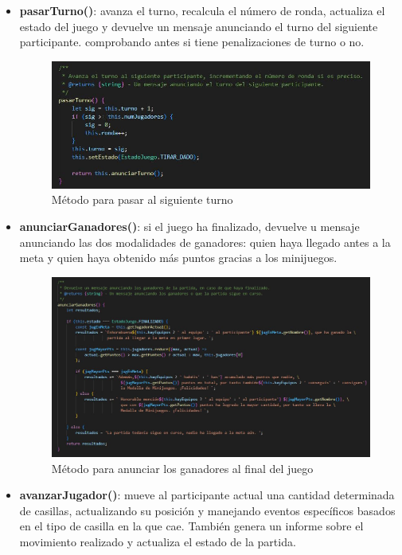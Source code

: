 \begin{itemize}
	\item \textbf{pasarTurno()}: avanza el turno, recalcula el número de ronda, actualiza el estado del juego y devuelve un mensaje anunciando el turno del siguiente participante. comprobando antes si tiene penalizaciones de turno o no.
	\begin{figure}[H]
		\centering
		\includegraphics{imgs/codigo-oca-5.jpg}
		\caption{Método para pasar al siguiente turno}
		\label{fig:codigo-oca-5}
	\end{figure} 
	
	\item \textbf{anunciarGanadores()}: si el juego ha finalizado, devuelve u mensaje anunciando las dos modalidades de ganadores: quien haya llegado antes a la meta y quien haya obtenido más puntos gracias a los minijuegos.
	\begin{figure}[H]
		\centering
		\includegraphics[width=1\textwidth]{imgs/codigo-oca-6.jpg}
		\caption{Método para anunciar los ganadores al final del juego}
		\label{fig:codigo-oca-6}
	\end{figure} 
	 
	\item \textbf{avanzarJugador()}: mueve al participante actual una cantidad determinada de casillas, actualizando su posición y manejando eventos específicos basados en el tipo de casilla en la que cae. También genera un informe sobre el movimiento realizado y actualiza el estado de la partida. \newline
	

\end{itemize}
